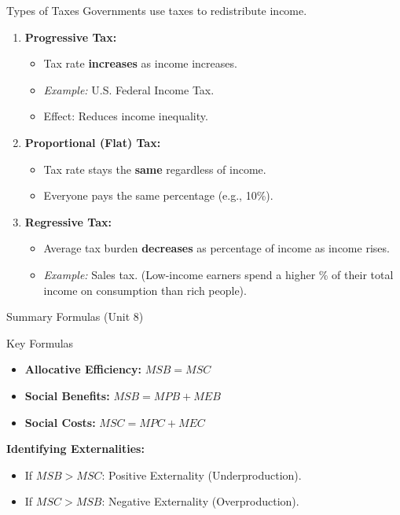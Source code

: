 \documentclass{beamer}
\begin{document}
\begin{frame}{Types of Taxes}
    Governments use taxes to redistribute income.
    
    \begin{enumerate}
        \item \textbf{Progressive Tax:}
        \begin{itemize}
            \item Tax rate \textbf{increases} as income increases.
            \item \textit{Example:} U.S. Federal Income Tax.
            \item Effect: Reduces income inequality.
        \end{itemize}
        
        \item \textbf{Proportional (Flat) Tax:}
        \begin{itemize}
            \item Tax rate stays the \textbf{same} regardless of income.
            \item Everyone pays the same percentage (e.g., 10\%).
        \end{itemize}
        
        \item \textbf{Regressive Tax:}
        \begin{itemize}
            \item Average tax burden \textbf{decreases} as percentage of income as income rises.
            \item \textit{Example:} Sales tax. (Low-income earners spend a higher \% of their total income on consumption than rich people).
        \end{itemize}
    \end{enumerate}
\end{frame}

\begin{frame}{Summary Formulas (Unit 8)}
    \begin{block}{Key Formulas}
        \begin{itemize}
            \item \textbf{Allocative Efficiency:} $MSB = MSC$
            \item \textbf{Social Benefits:} $MSB = MPB + MEB$
            \item \textbf{Social Costs:} $MSC = MPC + MEC$
        \end{itemize}
    \end{block}
    
    \vspace{0.5cm}
    \textbf{Identifying Externalities:}
    \begin{itemize}
        \item If $MSB > MSC$: Positive Externality (Underproduction).
        \item If $MSC > MSB$: Negative Externality (Overproduction).
    \end{itemize}
\end{frame}
\end{document}

